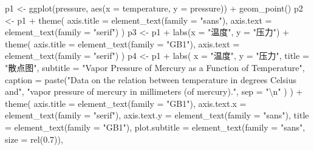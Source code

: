 \documentclass[
  b5paper,
  UTF8,twoside]{book}
\newenvironment{Shaded}{\begin{snugshade}}{\end{snugshade}}
\newcommand{\AttributeTok}[1]{\textcolor[rgb]{0.77,0.63,0.00}{#1}}
\newcommand{\FloatTok}[1]{\textcolor[rgb]{0.00,0.00,0.81}{#1}}
\newcommand{\FunctionTok}[1]{\textcolor[rgb]{0.00,0.00,0.00}{#1}}
\newcommand{\NormalTok}[1]{#1}
\newcommand{\OtherTok}[1]{\textcolor[rgb]{0.56,0.35,0.01}{#1}}
\newcommand{\SpecialCharTok}[1]{\textcolor[rgb]{0.00,0.00,0.00}{#1}}
\newcommand{\StringTok}[1]{\textcolor[rgb]{0.31,0.60,0.02}{#1}}
\begin{document}
\begin{Shaded}
\begin{Highlighting}[]
\NormalTok{p1 }\OtherTok{\textless{}{-}} \FunctionTok{ggplot}\NormalTok{(pressure, }\FunctionTok{aes}\NormalTok{(}\AttributeTok{x =}\NormalTok{ temperature, }\AttributeTok{y =}\NormalTok{ pressure)) }\SpecialCharTok{+}
  \FunctionTok{geom\_point}\NormalTok{()}
\NormalTok{p2 }\OtherTok{\textless{}{-}}\NormalTok{ p1 }\SpecialCharTok{+} \FunctionTok{theme}\NormalTok{(}
  \AttributeTok{axis.title =} \FunctionTok{element\_text}\NormalTok{(}\AttributeTok{family =} \StringTok{"sans"}\NormalTok{),}
  \AttributeTok{axis.text =} \FunctionTok{element\_text}\NormalTok{(}\AttributeTok{family =} \StringTok{"serif"}\NormalTok{)}
\NormalTok{)}
\NormalTok{p3 }\OtherTok{\textless{}{-}}\NormalTok{ p1 }\SpecialCharTok{+} \FunctionTok{labs}\NormalTok{(}\AttributeTok{x =} \StringTok{"温度"}\NormalTok{, }\AttributeTok{y =} \StringTok{"压力"}\NormalTok{) }\SpecialCharTok{+}
  \FunctionTok{theme}\NormalTok{(}
    \AttributeTok{axis.title =} \FunctionTok{element\_text}\NormalTok{(}\AttributeTok{family =} \StringTok{"GB1"}\NormalTok{),}
    \AttributeTok{axis.text =} \FunctionTok{element\_text}\NormalTok{(}\AttributeTok{family =} \StringTok{"serif"}\NormalTok{)}
\NormalTok{  )}
\NormalTok{p4 }\OtherTok{\textless{}{-}}\NormalTok{ p1 }\SpecialCharTok{+} \FunctionTok{labs}\NormalTok{(}
  \AttributeTok{x =} \StringTok{"温度"}\NormalTok{, }\AttributeTok{y =} \StringTok{"压力"}\NormalTok{, }\AttributeTok{title =} \StringTok{"散点图"}\NormalTok{,}
  \AttributeTok{subtitle =} \StringTok{"Vapor Pressure of Mercury as a Function of Temperature"}\NormalTok{,}
  \AttributeTok{caption =} \FunctionTok{paste}\NormalTok{(}\StringTok{"Data on the relation between temperature in degrees Celsius and"}\NormalTok{,}
    \StringTok{"vapor pressure of mercury in millimeters (of mercury)."}\NormalTok{,}
    \AttributeTok{sep =} \StringTok{"}\SpecialCharTok{\textbackslash{}n}\StringTok{"}
\NormalTok{  )}
\NormalTok{) }\SpecialCharTok{+}
  \FunctionTok{theme}\NormalTok{(}
    \AttributeTok{axis.title =} \FunctionTok{element\_text}\NormalTok{(}\AttributeTok{family =} \StringTok{"GB1"}\NormalTok{),}
    \AttributeTok{axis.text.x =} \FunctionTok{element\_text}\NormalTok{(}\AttributeTok{family =} \StringTok{"serif"}\NormalTok{),}
    \AttributeTok{axis.text.y =} \FunctionTok{element\_text}\NormalTok{(}\AttributeTok{family =} \StringTok{"sans"}\NormalTok{),}
    \AttributeTok{title =} \FunctionTok{element\_text}\NormalTok{(}\AttributeTok{family =} \StringTok{"GB1"}\NormalTok{),}
    \AttributeTok{plot.subtitle =} \FunctionTok{element\_text}\NormalTok{(}\AttributeTok{family =} \StringTok{"sans"}\NormalTok{, }\AttributeTok{size =} \FunctionTok{rel}\NormalTok{(}\FloatTok{0.7}\NormalTok{)),}

\end{Highlighting}
\end{Shaded}
\end{document}
